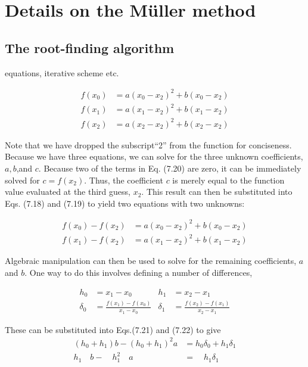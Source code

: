 \newpage
\section{Details on the Müller method}

\subsection{The root-finding algorithm}
equations, iterative scheme etc. 

\cite{chapra2010}

\begin{equation}
    \begin{aligned}
        f(x_0)&=a(x_0-x_2)^2+b(x_0-x_2)\\
        f(x_1)&=a(x_1-x_2)^2+b(x_1-x_2)\\
        f(x_2)&=a(x_2-x_2)^2+b(x_2-x_2)
    \end{aligned}
\end{equation}

Note that we have dropped the subscript“2” from the function for conciseness. Because we have three equations, we can solve for the three unknown coefficients, $a,b$,and $c.$ Because two of the terms in Eq. (7.20) are zero, it can be immediately solved for $c=f(x_{2}).$ Thus, the coefficient $c$ is merely equal to the function value evaluated at the third guess, $x_2.$ This result can then be substituted into Eqs. (7.18) and (7.19) to yield two equations with two unknowns:

$$\begin{aligned}
    f(x_0)-f(x_2)&=a(x_0-x_2)^2+b(x_0-x_2)\\
    f(x_1)-f(x_2)&=a(x_1-x_2)^2+b(x_1-x_2)\end{aligned}$$

Algebraic manipulation can then be used to solve for the remaining coefficients, $a$ and $b.$
One way to do this involves defining a number of differences,

$$\begin{aligned}h_0&=x_1-x_0&h_1&=x_2-x_1\\\delta_0&=\frac{f(x_1)-f(x_0)}{x_1-x_0}&\delta_1&=\frac{f(x_2)-f(x_1)}{x_2-x_1}\end{aligned}$$


These can be substituted into Eqs.(7.21) and (7.22) to give
$$\begin{aligned}(h_0+h_1)b-(h_0+h_1)^2a&=h_0\delta_0+h_1\delta_1\\h_1\quad b-\quad h_1^2\quad a&=\quad h_1\delta_1\end{aligned}$$

